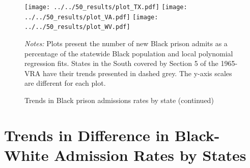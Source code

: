 \documentclass[12pt]{article}
\begin{document}
 \begin{figure}[h!]
 	\begin{center}
 	\caption{Trends in Black prison admissions rates by state (continued)}
 	\small

 		\vspace{.2in}

 			\texttt{[image: ../../50\_results/plot\_TX.pdf]}
 			\texttt{[image: ../../50\_results/plot\_VA.pdf]}
       \texttt{[image: ../../50\_results/plot\_WV.pdf]} \\
 	\label{figure_states2}
 	\end{center}
   {\scriptsize{\emph{Notes:} Plots present the number of new Black prison admits as a percentage of the statewide Black population and local polynomial regression fits.  States in the South covered by Section 5 of the 1965-VRA have their trends presented in dashed grey.  The y-axis scales are different for each plot.}}
 \end{figure} \normalsize











 \section{Trends in Difference in Black-White Admission Rates by States}\label{appendix_diff_rates_states}
 \setcounter{table}{0}
 \setcounter{figure}{0}
 \renewcommand{\thetable}{D\arabic{table}}
 \renewcommand{\thefigure}{D\arabic{figure}}
 \normalsize
\end{document}
